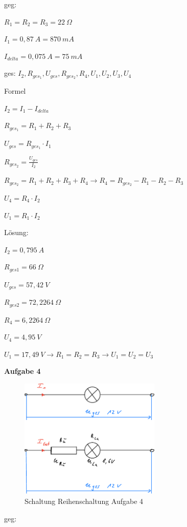 geg:

$R_1 = R_2 = R_3 = 22~\Omega$

$I_1 = 0,87~A = 870~mA$

$I_{delta} = 0,075~A = 75~mA$

ges: $I_2, R_{ges_1}, U_{ges}, R_{ges_2}, R_4, U_1, U_2, U_3, U_4$

Formel

$I_2 = I_1 - I_{delta}$

$R_{ges_1} = R_1 + R_2 + R_3$

$U_{ges} = R_{ges_1} \cdot I_1$

$R_{ges_2} = \frac{U_{ges}}{I_2}$

$R_{ges_2} = R_1 + R_2 + R_3 + R_4 \to R_4 = R_{ges_2} - R_1 - R_2 - R_3$

$U_4 = R_4 \cdot I_2$

$U_1 = R_1 \cdot I_2$

Lösung:

$I_2 = 0,795~A$

$R_{ges1} = 66~\Omega$

$U_{ges} = 57,42~V$

$R_{ges2} = 72,2264~\Omega$

$R_4 = 6,2264~\Omega$

$U_4 = 4,95~V$

$U_1 = 17,49~V \to R_1 = R_2 = R_3 \to U_1 = U_2 = U_3$

\newpage

\textbf{Aufgabe 4}

\begin{figure}[!ht]%
\centering
\includegraphics[width=0.6\textwidth]{images/Skizze/23_FM_Nr3_Reihenschaltung_Aufg4_Skizze.pdf}
\caption{Schaltung Reihenschaltung Aufgabe 4}
\end{figure}

geg:

